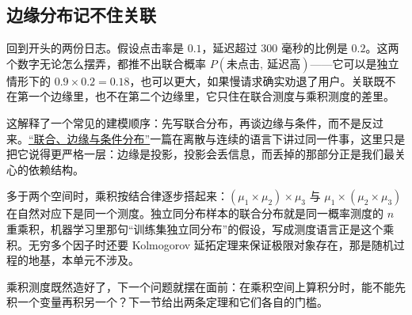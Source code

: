 \subsection{边缘分布记不住关联}

回到开头的两份日志。假设点击率是 \(0.1\)，延迟超过 300 毫秒的比例是 \(0.2\)。这两个数字无论怎么摆弄，都推不出联合概率 \(P(\text{未点击},\ \text{延迟高})\)——它可以是独立情形下的 \(0.9\times0.2=0.18\)，也可以更大，如果慢请求确实劝退了用户。关联既不在第一个边缘里，也不在第二个边缘里，它只住在联合测度与乘积测度的差里。

这解释了一个常见的建模顺序：先写联合分布，再谈边缘与条件，而不是反过来。\hyperref[sec:05-Probability/05-Joint-Distributions/01]{``联合、边缘与条件分布''}一篇在离散与连续的语言下讲过同一件事，这里只是把它说得更严格一层：边缘是投影，投影会丢信息，而丢掉的那部分正是我们最关心的依赖结构。

多于两个空间时，乘积按结合律逐步搭起来：\((\mu_1\times\mu_2)\times\mu_3\) 与 \(\mu_1\times(\mu_2\times\mu_3)\) 在自然对应下是同一个测度。独立同分布样本的联合分布就是同一概率测度的 \(n\) 重乘积，机器学习里那句``训练集独立同分布''的假设，写成测度语言正是这个乘积。无穷多个因子时还要 Kolmogorov 延拓定理来保证极限对象存在，那是随机过程的地基，本单元不涉及。

乘积测度既然造好了，下一个问题就摆在面前：在乘积空间上算积分时，能不能先积一个变量再积另一个？下一节给出两条定理和它们各自的门槛。
